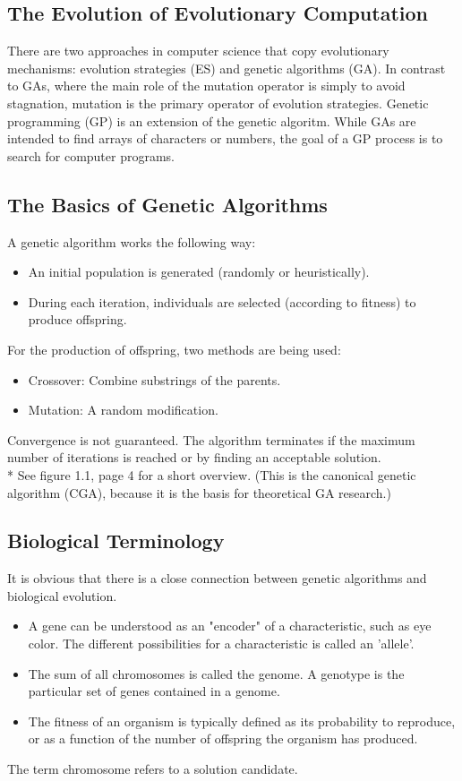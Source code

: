 \documentclass[12pt]{article}
\begin{document}
\subsection{The Evolution of Evolutionary Computation}
There are two approaches in computer science that copy evolutionary mechanisms: evolution strategies (ES) and genetic algorithms (GA). In contrast to GAs, where the main role of the mutation operator is simply to avoid stagnation, mutation is the primary operator of evolution strategies. Genetic programming (GP) is an extension of the genetic algoritm. While GAs are intended to find arrays of characters or numbers, the goal of a GP process is to search for computer programs.
\subsection{The Basics of Genetic Algorithms}
A genetic algorithm works the following way:
\begin{itemize}
\item An initial population is generated (randomly or heuristically).
\item During each iteration, individuals are selected (according to fitness) to produce offspring.
\end{itemize}
For the production of offspring, two methods are being used:
\begin{itemize}
\item Crossover: Combine substrings of the parents.
\item Mutation: A random modification.
\end{itemize}
Convergence is not guaranteed. The algorithm terminates if the maximum number of iterations is reached or by finding an acceptable solution.\\*
See figure 1.1, page 4 for a short overview. (This is the canonical genetic algorithm (CGA), because it is the basis for theoretical GA research.)
\subsection{Biological Terminology}
It is obvious that there is a close connection between genetic algorithms and biological evolution.
\begin{itemize}
\item A gene can be understood as an "encoder" of a characteristic, such as eye color.  The different possibilities for a characteristic is called an 'allele'.
\item The sum of all chromosomes is called the genome. A genotype is the particular set of genes contained in a genome.
\item The fitness of an organism is typically defined as its probability to reproduce, or as a function of the number of offspring the organism has produced.
\end{itemize}
The term chromosome refers to a solution candidate.
\end{document}
